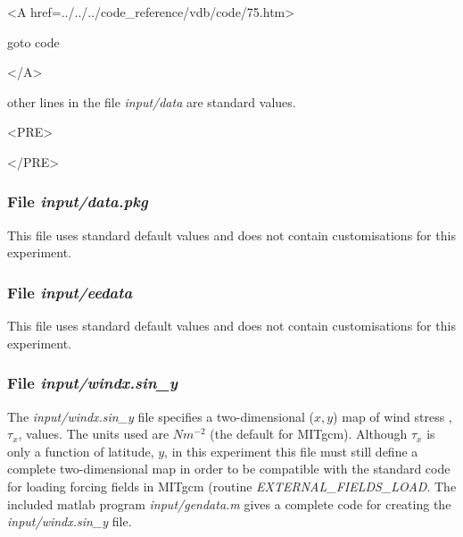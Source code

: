\begin{itemize}
{\bf
\begin{rawhtml} <A href=../../../code_reference/vdb/code/75.htm> \end{rawhtml}
goto code
\begin{rawhtml} </A>\end{rawhtml}
}

\end{itemize}

\noindent other lines in the file {\it input/data} are standard values.

\begin{rawhtml}<PRE>\end{rawhtml}
\begin{small}

\end{small}
\begin{rawhtml}</PRE>\end{rawhtml}

\subsubsection{File {\it input/data.pkg}}
\label{www:tutorials}

This file uses standard default values and does not contain
customisations for this experiment.

\subsubsection{File {\it input/eedata}}
\label{www:tutorials}

This file uses standard default values and does not contain
customisations for this experiment.

\subsubsection{File {\it input/windx.sin\_y}}
\label{www:tutorials}

The {\it input/windx.sin\_y} file specifies a two-dimensional ($x,y$) 
map of wind stress ,$\tau_{x}$, values. The units used are $Nm^{-2}$ (the
default for MITgcm).
Although $\tau_{x}$ is only a function of latitude, $y$,
in this experiment
this file must still define a complete two-dimensional map in order
to be compatible with the standard code for loading forcing fields 
in MITgcm (routine {\it EXTERNAL\_FIELDS\_LOAD}.
The included matlab program {\it input/gendata.m} gives a complete
code for creating the {\it input/windx.sin\_y} file.

